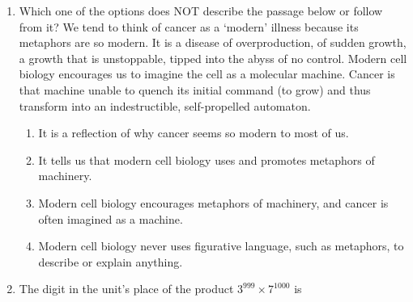 \documentclass[12pt]{article}
\theoremstyle{remark}
\begin{document}
\begin{enumerate}
\begin{figure}[H]
\caption{}
\label{Fig:1.2}
\end{figure}
\begin{enumerate}  \end{enumerate}
\hfill{}
\item Which one of the options does NOT describe the passage below or follow from it? 
 We tend to think of cancer as a ‘modern’ illness because its metaphors are so modern. It is a disease of overproduction, of sudden growth, a growth that is unstoppable, tipped into the abyss of no control. Modern cell biology encourages us to imagine the cell as a molecular machine. Cancer is that machine unable to quench its initial command (to grow) and thus transform into an indestructible, self-propelled automaton.\\
\begin{enumerate}
\item   It is a reflection of why cancer seems so modern to most of us. 
\item   It tells us that modern cell biology uses and promotes metaphors of machinery. 
\item   Modern cell biology encourages metaphors of machinery, and cancer is often imagined as a machine. 
\item   Modern cell biology never uses figurative language, such as metaphors, to describe or explain anything. 
\end{enumerate}
\hfill{}
\item The digit in the unit’s place of the product $3^{999} \times 7^{1000}$ is \\ 
\begin{enumerate}  \end{enumerate}
\hfill{}

\end{enumerate}
\end{document}
